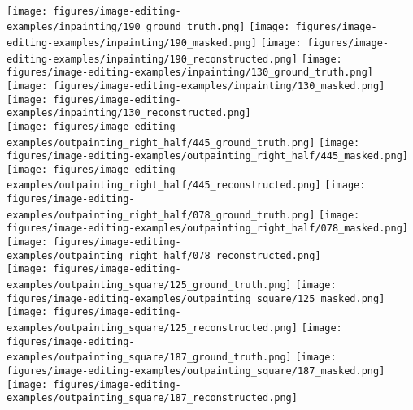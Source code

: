 \documentclass{article}
\newcommand{\hhs}{\hspace{-0.001em}}
\newcommand{\vvs}{\vspace{-.1em}}
\begin{document}
\begin{figure*}[h]
\centering
    \hhs
    \hhs
    \hspace{0.03\linewidth}
    \hhs
    \hhs
    \vvs
    \\
    \texttt{[image: figures/image-editing-examples/inpainting/190\_ground\_truth.png]}\hhs
    \texttt{[image: figures/image-editing-examples/inpainting/190\_masked.png]}\hhs
    \texttt{[image: figures/image-editing-examples/inpainting/190\_reconstructed.png]}\hspace{0.03\linewidth}
    \texttt{[image: figures/image-editing-examples/inpainting/130\_ground\_truth.png]}\hhs
    \texttt{[image: figures/image-editing-examples/inpainting/130\_masked.png]}\hhs
    \texttt{[image: figures/image-editing-examples/inpainting/130\_reconstructed.png]}\vvs
    \\
    \texttt{[image: figures/image-editing-examples/outpainting\_right\_half/445\_ground\_truth.png]}\hhs
    \texttt{[image: figures/image-editing-examples/outpainting\_right\_half/445\_masked.png]}\hhs
    \texttt{[image: figures/image-editing-examples/outpainting\_right\_half/445\_reconstructed.png]}\hspace{0.03\linewidth}
    \texttt{[image: figures/image-editing-examples/outpainting\_right\_half/078\_ground\_truth.png]}\hhs
    \texttt{[image: figures/image-editing-examples/outpainting\_right\_half/078\_masked.png]}\hhs
    \texttt{[image: figures/image-editing-examples/outpainting\_right\_half/078\_reconstructed.png]}\vvs
    \\
    \texttt{[image: figures/image-editing-examples/outpainting\_square/125\_ground\_truth.png]}\hhs
    \texttt{[image: figures/image-editing-examples/outpainting\_square/125\_masked.png]}\hhs
    \texttt{[image: figures/image-editing-examples/outpainting\_square/125\_reconstructed.png]}\hspace{0.03\linewidth}
    \texttt{[image: figures/image-editing-examples/outpainting\_square/187\_ground\_truth.png]}\hhs
    \texttt{[image: figures/image-editing-examples/outpainting\_square/187\_masked.png]}\hhs
    \texttt{[image: figures/image-editing-examples/outpainting\_square/187\_reconstructed.png]}\vvs
    \label{fig:more-editing}
\end{figure*}
 
\end{document}
